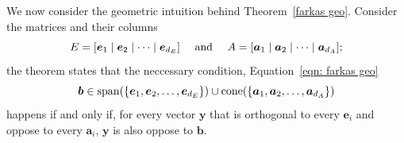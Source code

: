 We now consider the geometric intuition behind Theorem~\ref{farkas geo}. Consider the matrices and their columns 
\[E = [{\boldsymbol e}_1 \mid {\boldsymbol e}_2 \mid \dots \mid {\boldsymbol e}_{d_E}]\quad\text{ and }\quad A = [{\boldsymbol a}_1 \mid {\boldsymbol a}_2 \mid\dots \mid {\boldsymbol a}_{d_A}];\]
the theorem states that the neccessary condition, Equation~\ref{eqn: farkas geo} \[{\boldsymbol b}\in \operatorname{span}(\{\boldsymbol e_1, \boldsymbol e_2, \dots, {\boldsymbol e}_{d_E}\})\cup\operatorname{cone}(\{\boldsymbol a_1, \boldsymbol a_2, \dots, \boldsymbol a_{d_A}\})\] happens if and only if, for every vector $\bm y$ that is orthogonal to every $\bm e_i$ and oppose to every $\bm a_i$, $\bm y$ is also oppose to $\bm b$. 


